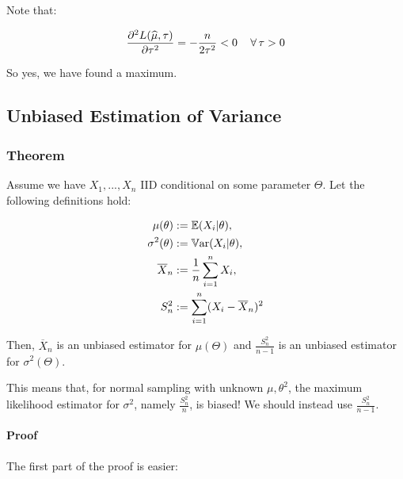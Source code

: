 \documentclass[a4paper]{article}
\begin{document}
            Note that:

            \[
                \frac{\partial^2 L(\widehat \mu, \tau)}{\partial \tau^2} =
                -\frac{n}{2\tau^2} < 0 \quad \,\forall\, \tau > 0
            \]

            So yes, we have found a maximum.

        \subsection{Unbiased Estimation of Variance}
            \begin{fread}
                [DS12, section 8.7]
            \end{fread}

            \subsubsection{Theorem}
                Assume we have $X_1, ..., X_n$ IID conditional on some parameter
                $\Theta$. Let the following definitions hold:

                \begin{align*}
                    \mu(\theta) & := \mathbb{E}(X_i | \theta), \\
                    \sigma^2(\theta) & := \mathbb{V}\text{ar}(X_i | \theta), \\
                    \overline X_n & := \frac{1}{n} \sum\limits_{i=1}^n X_i, \\
                    S_n^2 & := \sum\limits_{i=1}^n (X_i - \overline X_n)^2
                \end{align*}

                Then, $\overline X_n$ is an unbiased estimator for $\mu(\Theta)$
                and $\frac{S_n^2}{n - 1}$ is an unbiased estimator for
                $\sigma^2(\Theta)$.

                \begin{warn}
                    This means that, for normal sampling with unknown $\mu,
                    \theta^2$, the maximum likelihood estimator for $\sigma^2$,
                    namely $\frac{S_n^2}{n}$, is biased! We should instead use
                    $\frac{S_n^2}{n - 1}$.
                \end{warn}

                \paragraph{Proof}
                    The first part of the proof is easier:
\end{document}
